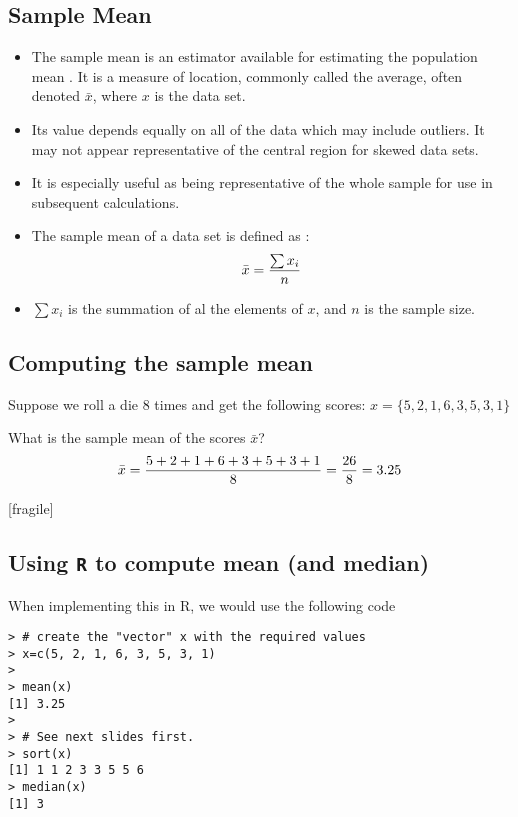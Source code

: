 \documentclass[]{report}
\begin{document}
{
\subsection{Sample Mean}

\begin{itemize}
\item The sample mean is an estimator available for estimating the population mean . It is a measure of location, commonly called the average, often denoted $\bar{x}$, where $x$ is the data set.
\item
Its value depends equally on all of the data which may include outliers. It may not appear representative of the central region for skewed data sets.
\item
It is especially useful as being representative of the whole sample for use in subsequent calculations.
\item The sample mean of a data set is defined as :
\[ \bar{x} = { \sum x_i\over n}\]
\item $\sum x_i$ is the summation of al the elements of $x$, and $n$ is the sample size.
\end{itemize}
}
{
\subsection{Computing the sample mean}

Suppose we roll a die 8 times and get the following scores: $x = \{ 5, 2, 1, 6, 3, 5, 3, 1\}$ \\ \bigskip

What is the sample mean of the scores $\bar{x}$?
\[ \bar{x}  = {5 + 2 +  1 +  6 +  3 +  5 +  3 +  1 \over 8 } = {26 \over 8} =  3.25 \]



}

[fragile]
\subsection{Using \texttt{R} to compute mean (and median)}
When implementing this in R, we would use the following code

\begin{verbatim}
> # create the "vector" x with the required values
> x=c(5, 2, 1, 6, 3, 5, 3, 1)
>
> mean(x)
[1] 3.25
>
> # See next slides first.
> sort(x)
[1] 1 1 2 3 3 5 5 6
> median(x)
[1] 3
\end{verbatim}
\end{document}
